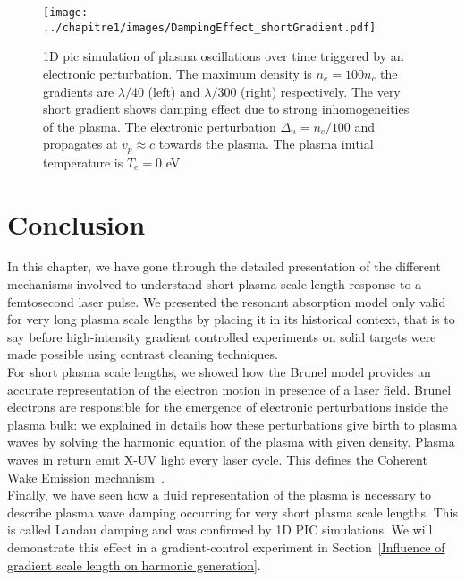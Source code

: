\begin{figure}[H]
\centering
\texttt{[image: ../chapitre1/images/DampingEffect\_shortGradient.pdf]}\\
\caption{\label{figDampingEffect_shortGradient}1D pic simulation of plasma oscillations over time triggered by an electronic perturbation. The maximum density is $n_e = 100 n_c$ the gradients are $\lambda /40$ (left) and $\lambda /300$ (right) respectively.
The very short gradient shows damping effect due to strong inhomogeneities of the plasma. The electronic perturbation $\Delta_n = n_c/100$ and propagates at $v_p\approx c$ towards the plasma. The plasma initial temperature is $T_e = 0$ eV}
\end{figure}




\section{Conclusion}

In this chapter, we have gone through the detailed presentation of the different mechanisms involved to understand short plasma scale length response to a femtosecond laser pulse. We presented the resonant absorption model only valid for very long plasma scale lengths by placing it in its historical context, that is to say before high-intensity gradient controlled experiments on solid targets were made possible using contrast cleaning techniques.\\

\noindent For short plasma scale lengths, we showed how the Brunel model provides an accurate representation of the electron motion in presence of a laser field. Brunel electrons are responsible for the emergence of electronic perturbations inside the plasma bulk: we explained in details how these perturbations give birth to plasma waves by solving the harmonic equation of the plasma with given density. Plasma waves in return emit X-UV light every laser cycle. This defines the Coherent Wake Emission mechanism~\cite{thaury2010high,dromey2009tunable,nomura2009attosecond}. \\

\noindent Finally, we have seen how a fluid representation of the plasma is necessary to describe plasma wave damping occurring for very short plasma scale lengths. This is called Landau damping and was confirmed by 1D PIC simulations. We will demonstrate this effect in a gradient-control experiment in Section~\ref{Influence of gradient scale length on harmonic generation}.\\
































